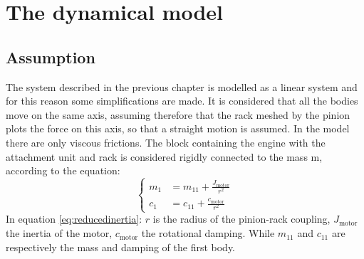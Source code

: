 \section{The dynamical model}
\label{sec:dynamicalmodel}

\subsection{Assumption}
\label{subsec:assumption}
The system described in the previous chapter is modelled as a linear system and
for this reason some simplifications are made.
It is considered that all the bodies move on the same axis, assuming therefore 
that the rack meshed by the pinion plots the force on this axis, so that a 
straight motion is assumed.
In the model there are only viscous frictions.
The block containing the engine with the attachment unit and rack is considered 
rigidly connected to the mass m, according to the equation:
\begin{equation}
	\label{eq:reducedinertia}
	\begin{cases}
		m_{1} &=  m_{11} + \frac{J_{\text{motor}}}{r^2}\\
		c_{1} &=  c_{11} + \frac{c_{\text{motor}}}{r^2}
	\end{cases}
\end{equation}
In equation \eqref{eq:reducedinertia}: $r$ is the radius of the pinion-rack 
coupling, $J_{\text{motor}}$ the inertia of the motor, $c_{\text{motor}}$ the 
rotational damping. 
While $m_{11}$ and $c_{11}$ are respectively the mass and damping of the first body.
%
